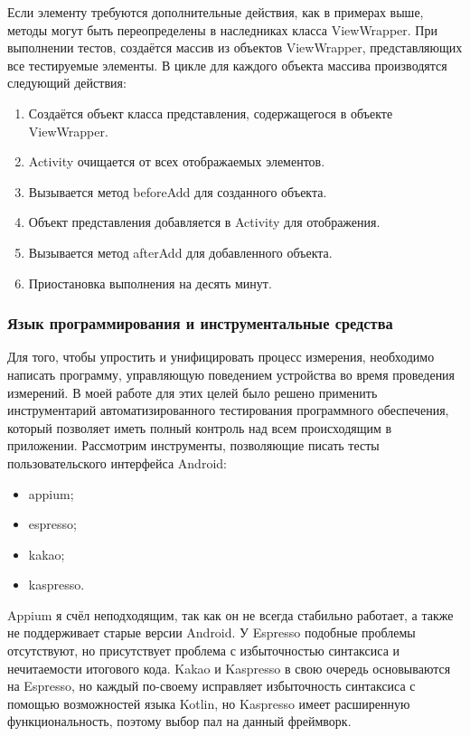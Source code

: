 \documentclass[a4paper,14pt]{extarticle} %
\begin{document}
	Если элементу требуются дополнительные действия, как в примерах выше, методы могут быть переопределены в наследниках класса ViewWrapper. При выполнении тестов, создаётся массив из объектов ViewWrapper, представляющих все тестируемые элементы. В цикле для каждого объекта массива производятся следующий действия:
	\begin{enumerate}
		\item Создаётся объект класса представления, содержащегося в объекте ViewWrapper.
		\item Activity очищается от всех отображаемых элементов.
		\item Вызывается метод beforeAdd для созданного объекта.
		\item Объект представления добавляется в Activity для отображения.
		\item Вызывается метод afterAdd для добавленного объекта.
		\item Приостановка выполнения на десять минут.
	\end{enumerate}
	
	\subsubsection{Язык программирования и  инструментальные средства}
	
	Для того, чтобы упростить и унифицировать процесс измерения, необходимо написать программу, управляющую поведением устройства во время проведения измерений. В моей работе для этих целей было решено применить инструментарий автоматизированного тестирования программного обеспечения, который позволяет иметь полный контроль над всем происходящим в приложении. Рассмотрим инструменты, позволяющие писать тесты пользовательского интерфейса Android:
	\begin{itemize}
		\item appium;
		\item espresso;
		\item kakao;
		\item kaspresso.
	\end{itemize}
	
	Appium я счёл неподходящим, так как он не всегда стабильно работает, а также не поддерживает старые версии Android. У Espresso подобные проблемы отсутствуют, но присутствует проблема с избыточностью синтаксиса и нечитаемости итогового кода. Kakao и Kaspresso в свою очередь основываются на Espresso, но каждый по-своему исправляет избыточность синтаксиса с помощью возможностей языка Kotlin, но Kaspresso имеет расширенную функциональность, поэтому выбор пал на данный фреймворк.
	
\end{document}
